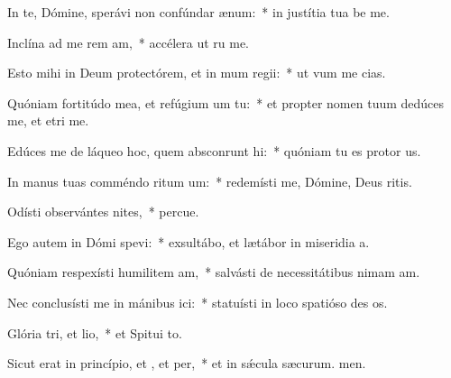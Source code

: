 \item In te, Dómine, sperávi non confúndar  ænum:~* in justítia tua be me.
\item Inclína ad me rem am,~* accélera ut ru me.
\item Esto mihi in Deum protectórem, et in mum regii:~* ut vum me cias.
\item Quóniam fortitúdo mea, et refúgium um  tu:~* et propter nomen tuum dedúces me, et etri me.
\item Edúces me de láqueo hoc, quem absconrunt hi:~* quóniam tu es protor us.
\item In manus tuas comméndo ritum um:~* redemísti me, Dómine, Deus ritis.
\item Odísti observántes nites,~* percue.
\item Ego autem in Dómi spevi:~* exsultábo, et lætábor in miseridia a.
\item Quóniam respexísti humilitem am,~* salvásti de necessitátibus nimam am.
\item Nec conclusísti me in mánibus ici:~* statuísti in loco spatióso des os.
\item Glória tri, et lio,~* et Spitui to.
\item Sicut erat in princípio, et , et per,~* et in sǽcula sæcurum. men.
